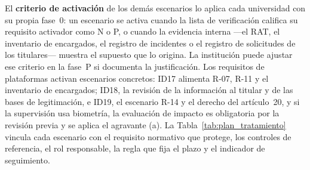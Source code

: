 El \textbf{criterio de activación} de los demás escenarios lo aplica cada universidad con su propia fase~0: un escenario se activa cuando la lista de verificación califica su requisito activador como N o P, o cuando la evidencia interna ---el RAT, el inventario de encargados, el registro de incidentes o el registro de solicitudes de los titulares--- muestra el supuesto que lo origina. La institución puede ajustar ese criterio en la fase~P si documenta la justificación. Los requisitos de plataformas activan escenarios concretos: ID17 alimenta R-07, R-11 y el inventario de encargados; ID18, la revisión de la información al titular y de las bases de legitimación, e ID19, el escenario R-14 y el derecho del artículo~20, y si la supervisión usa biometría, la evaluación de impacto es obligatoria por la revisión previa y se aplica el agravante (a). La Tabla~\ref{tab:plan_tratamiento} vincula cada escenario con el requisito normativo que protege, los controles de referencia, el rol responsable, la regla que fija el plazo y el indicador de seguimiento.

